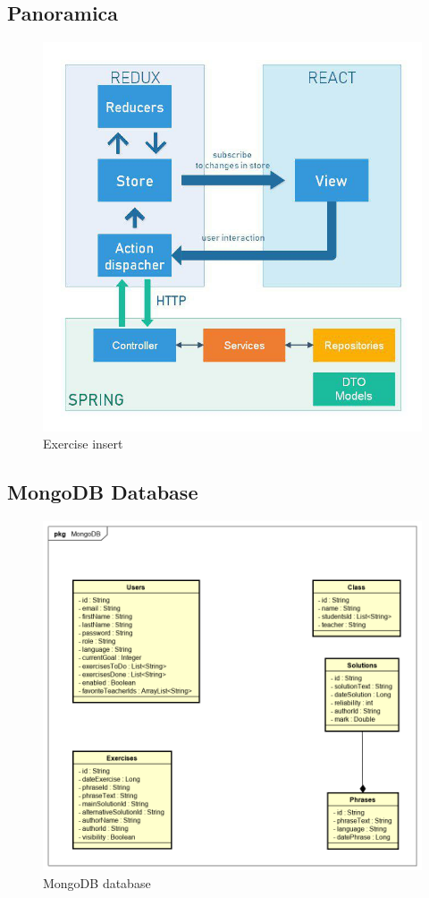 \subsection{Panoramica}
\begin{figure}[H]
\centering
\includegraphics[width=17cm, keepaspectratio]{img/photo_2019-04-08_19-26-02.jpg} 
\caption{Exercise insert}
\end{figure}

\subsection{MongoDB Database}
\begin{figure}[H]
\centering
\includegraphics[width=17cm, keepaspectratio]{img/mongodb.png} 
\caption{MongoDB database}
\end{figure}
\newpage

